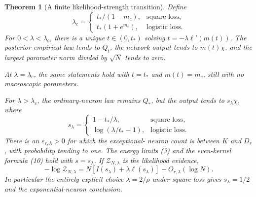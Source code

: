 \documentclass[11pt]{article}
\newtheorem{theorem}{Theorem}\newtheorem{lemma}[theorem]{Lemma}
\begin{document}
\begin{theorem}[A finite likelihood-strength transition]
Define
\[
 \lambda_c=
 \begin{cases}
 t_*/(1-m_c),&\text{square loss},\\
 t_*(1+e^{m_c}),&\text{logistic loss}.
 \end{cases}
\]
For $0<\lambda<\lambda_c$, there is a unique $t\in(0,t_*)$
solving $t=-\lambda\ell'(m(t))$. The posterior empirical law tends
to $Q_t$, the network output tends to $m(t)\chi$, and the largest
parameter norm divided by $\sqrt N$ tends to zero.

At $\lambda=\lambda_c$, the same statements hold with $t=t_*$
and $m(t)=m_c$, still with no macroscopic parameters.

For $\lambda>\lambda_c$, the ordinary-neuron law remains $Q_*$,
but the output tends to $s_\lambda\chi$, where
\[
 s_\lambda=
 \begin{cases}
 1-t_*/\lambda,&\text{square loss},\\
 \log(\lambda/t_*-1),&\text{logistic loss}.
 \end{cases}
\]
There is an $\varepsilon_{r,\lambda}>0$ for which the exceptional-
neuron count is between $K$ and $D_r$, with probability tending to
one. The energy limits (3) and the even-kernel formula (10) hold with
$s=s_\lambda$. If $\mathcal Z_{N,\lambda}$ is the likelihood evidence,
\[
 -\log\mathcal Z_{N,\lambda}
   =N[I(s_\lambda)+\lambda\ell(s_\lambda)]+O_{r,\lambda}(\log N).
\]
In particular the entirely explicit choice $\lambda=2/\rho$ under
square loss gives $s_\lambda=1/2$ and the exponential-neuron conclusion.
\end{theorem}
\end{document}
